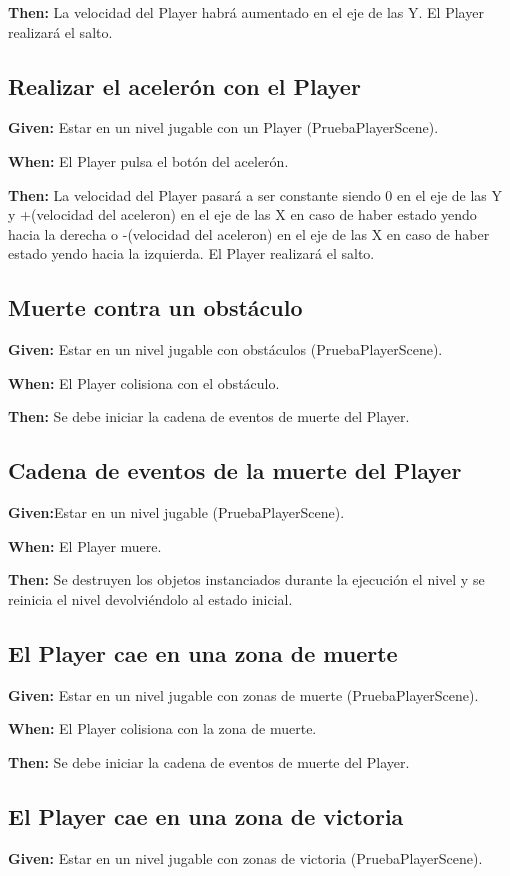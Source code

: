 \textbf{Then:} La velocidad del Player habrá aumentado en el eje de las Y. El Player realizará el salto.

\subsection{Realizar el acelerón con el Player}
\textbf{Given:} Estar en un nivel jugable con un Player (PruebaPlayerScene).

\textbf{When:} El Player pulsa el botón del acelerón.

\textbf{Then:} La velocidad del Player pasará a ser constante siendo 0 en el eje de las Y y +(velocidad del aceleron) en el eje de las X en caso de haber estado yendo hacia la derecha o -(velocidad del aceleron) en el eje de las X en caso de haber estado yendo hacia la izquierda. El Player realizará el salto.

\subsection{Muerte contra un obstáculo}
\textbf{Given:} Estar en un nivel jugable con obstáculos (PruebaPlayerScene).

\textbf{When:} El Player colisiona con el obstáculo.

\textbf{Then:} Se debe iniciar la cadena de eventos de muerte del Player.

\subsection{Cadena de eventos de la muerte del Player}
\textbf{Given:}Estar en un nivel jugable (PruebaPlayerScene).

\textbf{When:} El Player muere.

\textbf{Then:} Se destruyen los objetos instanciados durante la ejecución el nivel y se reinicia el nivel devolviéndolo al estado inicial.

\subsection{El Player cae en una zona de muerte}
\textbf{Given:} Estar en un nivel jugable con zonas de muerte (PruebaPlayerScene).

\textbf{When:} El Player colisiona con la zona de muerte.

\textbf{Then:} Se debe iniciar la cadena de eventos de muerte del Player.

\subsection{El Player cae en una zona de victoria}
\textbf{Given:} Estar en un nivel jugable con zonas de victoria (PruebaPlayerScene).

